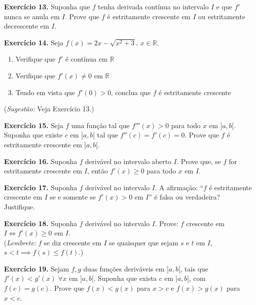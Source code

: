 \documentclass[12pt,a4paper]{article}
\begin{document}
\vspace{0.5cm}
\noindent\textbf{Exercício 13.} Suponha que $f$ tenha derivada contínua no intervalo $I$ e que $f'$ nunca se anula em $I$. Prove que $f$ é estritamente crescente em $I$ ou estritamente decrescente em $I$.

\vspace{0.5cm}
\noindent\textbf{Exercício 14.} Seja $f(x) = 2x - \sqrt{x^2 + 3}$, $x \in \mathbb{R}$.
\begin{enumerate}
    \renewcommand{\theenumi}{\alph{enumi}}
    \renewcommand{\labelenumi}{\theenumi)}
    \item Verifique que $f'$ é contínua em $\mathbb{R}$
    \item Verifique que $f'(x) \neq 0$ em $\mathbb{R}$
    \item Tendo em vista que $f'(0) > 0$, conclua que $f$ é estritamente crescente
\end{enumerate}
(\textit{Sugestão:} Veja Exercício 13.)

\vspace{0.5cm}
\noindent\textbf{Exercício 15.} Seja $f$ uma função tal que $f'''(x) > 0$ para todo $x$ em ${]a, b[}$. Suponha que existe $c$ em ${]a, b[}$ tal que $f''(c) = f'(c) = 0$. Prove que $f$ é estritamente crescente em ${]a, b[}$.

\vspace{0.5cm}
\noindent\textbf{Exercício 16.} Suponha $f$ derivável no intervalo aberto $I$. Prove que, se $f$ for estritamente crescente em $I$, então $f'(x) \ge 0$ para todo $x$ em $I$.

\vspace{0.5cm}
\noindent\textbf{Exercício 17.} Suponha $f$ derivável no intervalo $I$. A afirmação: ``$f$ é estritamente crescente em $I$ se e somente se $f'(x) > 0$ em $I$'' é falsa ou verdadeira? Justifique.

\vspace{0.5cm}
\noindent\textbf{Exercício 18.} Suponha $f$ derivável no intervalo $I$. Prove: $f$ crescente em $I \iff f'(x) \ge 0$ em $I$.\\
(\textit{Lembrete:} $f$ se diz crescente em $I$ se quaisquer que sejam $s$ e $t$ em $I$, $s < t \implies f(s) \le f(t)$.)

\vspace{0.5cm}
\noindent\textbf{Exercício 19.} Sejam $f, g$ duas funções deriváveis em ${]a, b[}$, tais que $f'(x) < g'(x)\; \forall x$ em ${]a, b[}$. Suponha que exista $c$ em ${]a, b[}$, com $f(c) = g(c)$. Prove que $f(x) < g(x)$ para $x > c$ e $f(x) > g(x)$ para $x < c$.
\end{document}
